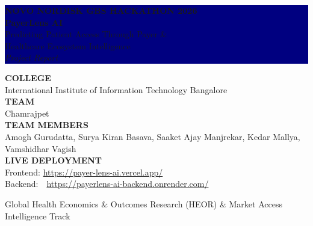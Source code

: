 \documentclass[11pt,a4paper]{article}
\begin{document}
\begin{titlepage}
\noindent
\colorbox{navy}{\parbox[c][3.2in][c]{\paperwidth}{
\hspace{1in}
\begin{minipage}{5.5in}
{\color{slate400}\sffamily\bfseries\small NOVO NORDISK GBS HACKATHON 2026}\\[0.35in]
{\color{white}\sffamily\bfseries\fontsize{34}{40}\selectfont PayerLens AI}\\[0.15in]
{\color{white!85!navy}\sffamily\Large Predicting Patient Access Through Payer \& \\Healthcare Ecosystem Intelligence}\\[0.3in]
{\color{white}\sffamily\itshape\normalsize Project Report}
\end{minipage}
}}

\vspace{0.6in}
\hspace{1in}
\begin{minipage}{5.5in}
\sffamily
{\color{slate400}\bfseries\small COLLEGE}\\
{\color{slate900}\large International Institute of Information Technology Bangalore}\\[0.25in]
{\color{slate400}\bfseries\small TEAM}\\
{\color{slate900}\Large Chamrajpet}\\[0.25in]
{\color{slate400}\bfseries\small TEAM MEMBERS}\\
{\color{slate600}\large Amogh Gurudatta, Surya Kiran Basava, Saaket Ajay Manjrekar, Kedar Mallya, Vamshidhar Vagish}\\[0.45in]
{\color{slate400}\bfseries\small LIVE DEPLOYMENT}\\
{\color{slate600}\normalsize
Frontend: \url{https://payer-lens-ai.vercel.app/}\\
Backend:\ \ \url{https://payerlens-ai-backend.onrender.com/}}
\end{minipage}

\vfill
\hspace{1in}
\begin{minipage}{5.5in}
\color{slate400}\sffamily\small
Global Health Economics \& Outcomes Research (HEOR) \& Market Access Intelligence Track
\end{minipage}
\vspace{0.5in}
\restoregeometry
\end{titlepage}
\end{document}
